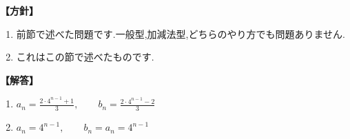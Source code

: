 \documentclass[dvipdfmx,a4paper,11pt,fleqn,openany]{jsbook}
\begin{document}
      \noindent\textbf{【方針】}
      \begin{enumerate}[label=(\arabic*),parsep=3pt]
        \item 前節で述べた問題です.一般型,加減法型,どちらのやり方でも問題ありません.
        \item これはこの節で述べたものです.
      \end{enumerate}

      \noindent\textbf{【解答】}
      \begin{enumerate}[label=(\arabic*),parsep=3pt]
        \item $\displaystyle a_n=\frac{2\cdot4^{n-1}+1}{3},\qquad b_n=\frac{2\cdot4^{n-1}-2}{3}$
        \item $\displaystyle a_n=4^{n-1},\qquad b_n=a_n=4^{n-1}$
      \end{enumerate}
\end{document}
